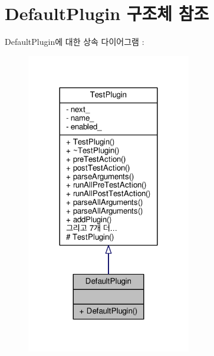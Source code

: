 \hypertarget{struct_default_plugin}{}\section{Default\+Plugin 구조체 참조}
\label{struct_default_plugin}


Default\+Plugin에 대한 상속 다이어그램 \+: 
\nopagebreak
\begin{figure}[H]
\begin{center}
\leavevmode
\includegraphics[width=204pt]{struct_default_plugin__inherit__graph}
\end{center}
\end{figure}



